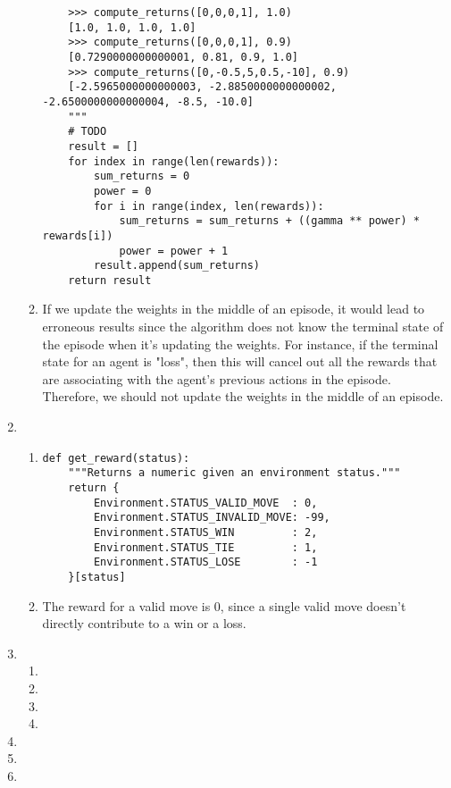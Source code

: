 \documentclass[10pt,letterpaper]{article}
\begin{document}
\begin{enumerate}
\begin{enumerate}
\begin{lstlisting}
    >>> compute_returns([0,0,0,1], 1.0)
    [1.0, 1.0, 1.0, 1.0]
    >>> compute_returns([0,0,0,1], 0.9)
    [0.7290000000000001, 0.81, 0.9, 1.0]
    >>> compute_returns([0,-0.5,5,0.5,-10], 0.9)
    [-2.5965000000000003, -2.8850000000000002, -2.6500000000000004, -8.5, -10.0]
    """
    # TODO
    result = []
    for index in range(len(rewards)):
        sum_returns = 0
        power = 0
        for i in range(index, len(rewards)):
            sum_returns = sum_returns + ((gamma ** power) * rewards[i])
            power = power + 1
        result.append(sum_returns)
    return result
			\end{lstlisting}
			\item %
			If we update the weights in the middle of an episode, it would lead to erroneous results since the algorithm does not know the terminal state of the episode when it's updating the weights. For instance, if the terminal state for an agent is "loss", then this will cancel out all the rewards that are associating with the agent's previous actions in the episode. Therefore, we should not update the weights in the middle of an episode.
		\end{enumerate}
		\item %
		\begin{enumerate}
			\item %
			\begin{lstlisting}
def get_reward(status):
    """Returns a numeric given an environment status."""
    return {
        Environment.STATUS_VALID_MOVE  : 0,
        Environment.STATUS_INVALID_MOVE: -99,
        Environment.STATUS_WIN         : 2,
        Environment.STATUS_TIE         : 1,
        Environment.STATUS_LOSE        : -1
    }[status]
			\end{lstlisting}
			\item %
			The reward for a valid move is 0, since a single valid move doesn't directly contribute to a win or a loss.
			
		\end{enumerate}
		\item %
		\begin{enumerate}
			\item %
			\item %
			\item %
			\item %
		\end{enumerate}
		\item %
		\item %
		\item %
	\end{enumerate}
\end{document}
